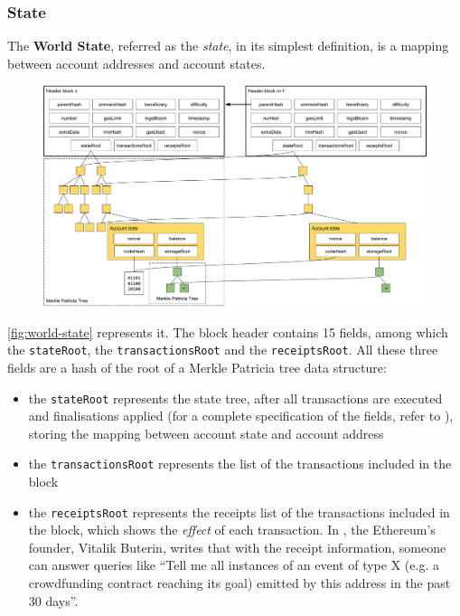\subsubsection{State}
\label{sec:world-state}

The \textbf{World State}, referred as the \emph{state}, in its simplest
definition, is a mapping between account addresses and account states.

\begin{figure}[h]
  \centering
  \includegraphics[width=\textwidth]{./res/img/world-state.pdf}
\label{fig:world-state}
\end{figure}

\autoref{fig:world-state} represents it. The block header contains 15 fields,
among which the \verb+stateRoot+, the \verb+transactionsRoot+ and the
\verb+receiptsRoot+. All these three fields are a hash of the root of a Merkle
Patricia tree data structure:

\begin{itemize}
  \item the \verb+stateRoot+ represents the state tree, after all transactions
  are executed and finalisations applied (for a complete specification of the
  fields, refer to \cite{wood2018ethereum}), storing the mapping between account
  state and account address
  \item the \verb+transactionsRoot+ represents the list of the transactions
  included in the block
  \item the \verb+receiptsRoot+ represents the receipts list of the transactions
  included in the block, which shows the \emph{effect} of each transaction. In
  \cite{merklingethereum}, the Ethereum's founder, Vitalik Buterin, writes that
  with the receipt information, someone can answer queries like ``Tell me all
  instances of an event of type X (e.g. a crowdfunding contract reaching its
  goal) emitted by this address in the past 30 days''.
\end{itemize}

